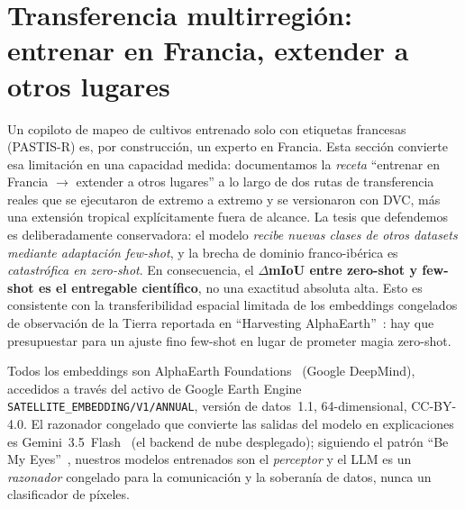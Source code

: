 
\section{Transferencia multirregión: entrenar en Francia, extender a otros lugares}
\label{sec:multiregion}

Un copiloto de mapeo de cultivos entrenado solo con etiquetas francesas
(PASTIS-R) es, por construcción, un experto en Francia. Esta sección
convierte esa limitación en una capacidad medida: documentamos la
\emph{receta} ``entrenar en Francia $\rightarrow$ extender a otros
lugares'' a lo largo de dos rutas de transferencia reales que se
ejecutaron de extremo a extremo y se versionaron con DVC, más una
extensión tropical explícitamente fuera de alcance. La tesis que defendemos es
deliberadamente conservadora: el modelo \emph{recibe nuevas clases de
otros datasets mediante adaptación few-shot}, y la brecha de dominio
franco-ibérica es \emph{catastrófica en zero-shot}. En consecuencia, el
\textbf{$\Delta$mIoU entre zero-shot y few-shot es el entregable
científico}, no una exactitud absoluta alta. Esto es consistente con la
transferibilidad espacial limitada de los embeddings congelados de
observación de la Tierra reportada en ``Harvesting
AlphaEarth''~\cite{harvesting2026alphaearth}: hay que presupuestar para
un ajuste fino few-shot en lugar de prometer magia zero-shot.

Todos los embeddings son AlphaEarth Foundations~\cite{brown2025alphaearth}
(Google DeepMind), accedidos a través del activo de Google Earth Engine
\texttt{SATELLITE\_EMBEDDING/V1/ANNUAL}, versión de datos~1.1,
64-dimensional, CC-BY-4.0. El razonador congelado que convierte las
salidas del modelo en explicaciones es
Gemini~3.5~Flash~\cite{google2025gemini25} (el backend de nube desplegado);
siguiendo el patrón ``Be My Eyes''~\cite{huang2025bemyeyes}, nuestros
modelos entrenados son el \emph{perceptor} y el LLM es un \emph{razonador}
congelado para la comunicación y la soberanía de datos, nunca un
clasificador de píxeles.

